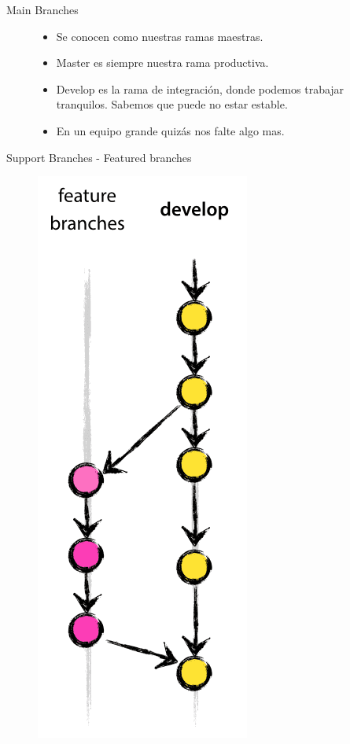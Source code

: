 \documentclass{beamer}
\begin{document}
\begin{frame}{Main Branches}
\begin{figure}
\begin{minipage}{0.6\textwidth}
\begin{itemize}
  \item Se conocen como nuestras ramas maestras.
  \item Master es siempre nuestra rama productiva.
  \item Develop es la rama de integración, donde podemos trabajar tranquilos. Sabemos que puede no estar estable.
  \item En un equipo grande quizás nos falte algo mas.
\end{itemize}	
\end{minipage}
\end{figure}
\end{frame}

\begin{frame}{Support Branches - Featured branches}
\begin{figure}
	\begin{minipage}{0.3\textwidth}
		\includegraphics[scale=0.20,left]{fb.png}

\end{minipage}
\end{figure}
\end{frame}
\end{document}
